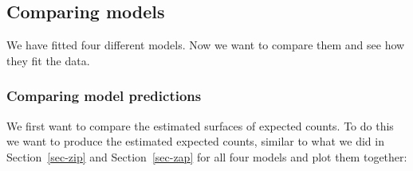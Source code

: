 \documentclass[
  letterpaper,
  DIV=11,
  numbers=noendperiod]{scrartcl}
\begin{document}
\subsection{Comparing models}\label{comparing-models}

We have fitted four different models. Now we want to compare them and
see how they fit the data.

\subsubsection{Comparing model
predictions}\label{comparing-model-predictions}

We first want to compare the estimated surfaces of expected counts. To
do this we want to produce the estimated expected counts, similar to
what we did in Section~\ref{sec-zip} and Section~\ref{sec-zap} for all
four models and plot them together:
\end{document}
